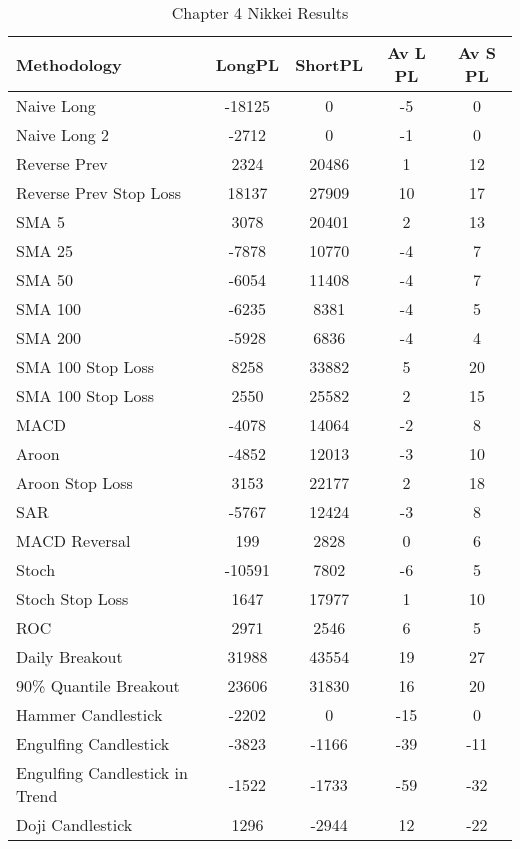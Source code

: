 \begin{table}[ht]
\centering
\caption[Chapter 4 Nikkei Results]{Chapter 4 Nikkei Results} 
\label{tab:chp6:nik_summary}
\begin{tabular}{lcccc}
  \toprule Methodology & LongPL & ShortPL & Av L PL & Av S PL \\ 
  \midrule Naive Long & -18125 & 0 & -5 & 0 \\ 
  Naive Long 2 & -2712 & 0 & -1 & 0 \\ 
  Reverse Prev & 2324 & 20486 & 1 & 12 \\ 
  Reverse Prev Stop Loss & 18137 & 27909 & 10 & 17 \\ 
  SMA 5 & 3078 & 20401 & 2 & 13 \\ 
  SMA 25 & -7878 & 10770 & -4 & 7 \\ 
  SMA 50 & -6054 & 11408 & -4 & 7 \\ 
  SMA 100 & -6235 & 8381 & -4 & 5 \\ 
  SMA 200 & -5928 & 6836 & -4 & 4 \\ 
  SMA 100 Stop Loss & 8258 & 33882 & 5 & 20 \\ 
  SMA 100 Stop Loss & 2550 & 25582 & 2 & 15 \\ 
  MACD & -4078 & 14064 & -2 & 8 \\ 
  Aroon & -4852 & 12013 & -3 & 10 \\ 
  Aroon Stop Loss & 3153 & 22177 & 2 & 18 \\ 
  SAR & -5767 & 12424 & -3 & 8 \\ 
  MACD Reversal & 199 & 2828 & 0 & 6 \\ 
  Stoch & -10591 & 7802 & -6 & 5 \\ 
  Stoch Stop Loss & 1647 & 17977 & 1 & 10 \\ 
  ROC & 2971 & 2546 & 6 & 5 \\ 
  Daily Breakout & 31988 & 43554 & 19 & 27 \\ 
  90\% Quantile Breakout & 23606 & 31830 & 16 & 20 \\ 
  Hammer Candlestick & -2202 & 0 & -15 & 0 \\ 
  Engulfing Candlestick & -3823 & -1166 & -39 & -11 \\ 
  Engulfing Candlestick in Trend & -1522 & -1733 & -59 & -32 \\ 
  Doji Candlestick & 1296 & -2944 & 12 & -22 \\ 
   \bottomrule \end{tabular}
\end{table}
